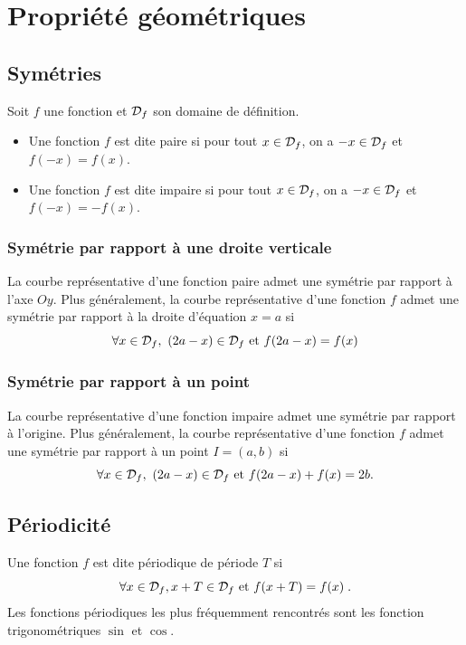 \section{Propri\'et\'e g\'eom\'etriques}
      \subsection{Sym\'etries}
            \begin{defi}
                  Soit $f$ une fonction et $\mathcal{D}_f$ son domaine de d\'efinition.
                  \begin{itemize}
                        \item Une fonction $f$ est dite paire si pour tout $x\in\mathcal{D}_f$, on a $-x\in\mathcal{D}_f$ et $f(-x) = f(x)$.
                        \item Une fonction $f$ est dite impaire si pour tout $x\in\mathcal{D}_f$, on a $-x\in\mathcal{D}_f$ et $f(-x) = -f(x)$.
                  \end{itemize}
            \end{defi}
            \subsubsection{Sym\'etrie par rapport \`a une droite verticale}
                  La courbe repr\'esentative d'une fonction paire admet une sym\'etrie par rapport \`a l'axe $Oy$.
                  Plus g\'en\'eralement, 
                  la courbe repr\'esentative d'une fonction $f$ admet une sym\'etrie
                  par rapport \`a la droite d'\'equation $x=a$ si
                  \[   \forall x\in\mathcal{D}_f,\ (2a-x)\in\mathcal{D}_f \text{ et } f(2a-x) = f(x)   \]
            \subsubsection{Sym\'etrie par rapport \`a un point}
                  La courbe repr\'esentative d'une fonction impaire admet une sym\'etrie par rapport \`a l'origine.
                  Plus g\'en\'eralement, 
                  la courbe repr\'esentative d'une fonction $f$ admet une sym\'etrie par rapport \`a un point $I = (a,b)$ si
                  \[   \forall x\in\mathcal{D}_f,\ (2a-x)\in\mathcal{D}_f \text{ et } f(2a-x) + f(x) = 2 b .  \]
      \subsection{P\'eriodicit\'e}
            Une fonction $f$ est dite p\'eriodique de p\'eriode $T$ si 
                  \[ \forall x \in \mathcal{D}_f, x+T\in\mathcal{D}_f \text{ et } f(x+T) = f(x)      \;. \]
            Les fonctions p\'eriodiques les plus fr\'equemment rencontr\'es sont 
            les fonction trigonom\'etriques $\sin$ et $\cos$.
            
